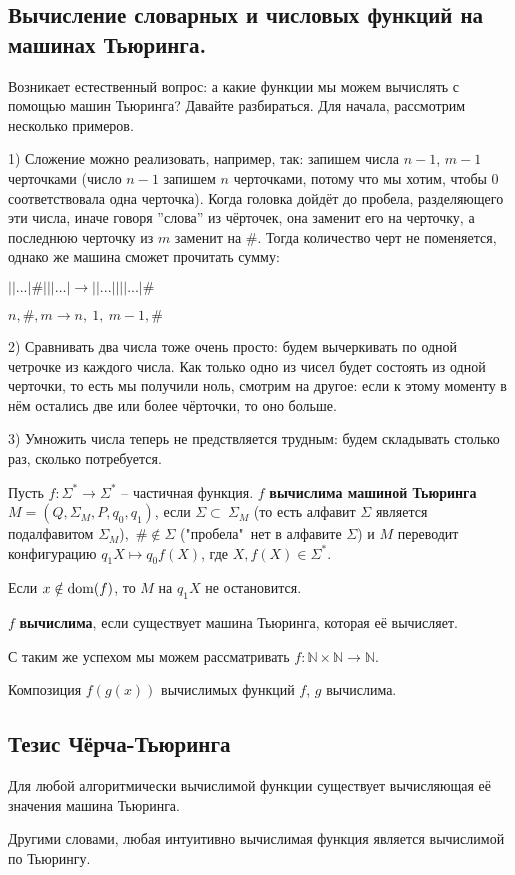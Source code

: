 \subsection*{Вычисление словарных и числовых функций на машинах Тьюринга.}
\par Возникает естественный вопрос: а какие функции мы можем вычислять с помощью машин Тьюринга? Давайте
разбираться. Для начала, рассмотрим несколько примеров.
\par 
\begin{example}
	\par 1) Сложение можно реализовать, например, так: запишем числа $n-1$, $m-1$ черточками (число $n-1$ запишем $n$
	черточками, потому что мы хотим, чтобы 0 соответствовала одна черточка). Когда головка дойдёт до пробела,
	разделяющего эти числа, иначе говоря ''слова'' из чёрточек, она заменит его на черточку, а последнюю черточку
	из $m$ заменит на $\#$. Тогда количество черт не поменяется, однако же машина сможет прочитать сумму:
	\par $||...| \#|||...| \to ||...||||...|\#$
	\par $n, \#, m \to n,\ 1,\ m-1, \#$
	\par 2) Сравнивать два числа тоже очень просто: будем вычеркивать по одной четрочке из каждого числа. Как только
	одно из чисел будет состоять из одной черточки, то есть мы получили ноль, смотрим на другое: если к этому
	моменту в нём остались две или более чёрточки, то оно больше.
	\par 3) Умножить числа теперь не предствляется трудным: будем складывать столько раз, сколько потребуется. 
\end{example}
\par 
\begin{definition}
	Пусть $f\colon\Sigma^* \to\Sigma^*$ -- частичная функция. $f$ \textbf{вычислима машиной Тьюринга} $M=(Q,
	\Sigma_{M}, P, q_{0}, q_{1})$, если $\Sigma \subset\ \Sigma_{M}$ (то есть алфавит $\Sigma$ является
	подалфавитом $\Sigma_{M}$),\ $\# \notin \Sigma$ ("пробела"\ нет в алфавите $\Sigma$) и $M$ переводит
	конфигурацию $q_{1}X \mapsto q_{0}f(X)$, где $X, f(X) \in \Sigma^*$.
\end{definition}
\par Если $x \notin\operatorname{dom}(f)$, то $M$ на $q_{1}X$ не остановится.
\begin{definition} $f$ \textbf{вычислима}, если существует машина Тьюринга, которая её вычисляет.
\end{definition}

\begin{remark}
	\par С таким же успехом мы можем рассматривать $f: \mathbb{N} \times \mathbb{N} \to \mathbb{N}$. 
\end{remark}
\begin{remark}
	\par Композиция $f(g(x))$ вычислимых функций $f$, $g$ вычислима.
\end{remark}
\subsection*{Тезис Чёрча-Тьюринга}
\begin{theorem} Для любой алгоритмически вычислимой функции существует вычисляющая
	её значения машина Тьюринга.
\end{theorem}
Другими словами, любая интуитивно вычислимая функция является вычислимой по Тьюрингу.
